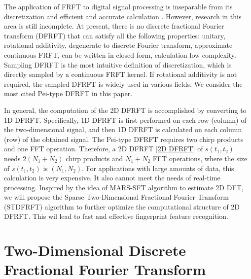 \documentclass[conference]{IEEEtran}
\begin{document}
The application of FRFT to digital signal processing is inseparable from its discretization and efficient and accurate calculation \cite{b4}. However, research in this area is still incomplete. At present, there is no discrete fractional Fourier transform (DFRFT) that can satisfy all the following properties: unitary, rotational additivity, degenerate to discrete Fourier transform, approximate continuous FRFT, can be written in closed form, calculation low complexity. Sampling DFRFT is the most intuitive definition of discretization, which is directly sampled by a continuous FRFT kernel. If rotational additivity is not required, the sampled DFRFT is widely used in various fields. We consider the most cited Pei-type \cite{b2} DFRFT in this paper.

In general, the computation of the 2D DFRFT \cite{Kumari2021} is accomplished by converting to 1D DFRFT. Specifically, 1D DFRFT is first performed on each row (column) of the two-dimensional signal, and then 1D DFRFT is calculated on each column (row) of the obtained signal. The Pei-type DFRFT requires two chirp products and one FFT operation. Therefore, a 2D DFRFT \eqref{2D DFRFT} of $s({t_1},{t_2})$ needs $2({N_1} + {N_2})$ chirp products and ${N_1} + {N_2}$ FFT operations, where the size of $s({t_1},{t_2})$ is $(N_1,N_2)$. For applications with large amounts of data, this calculation is very expensive. It also cannot meet the needs of real-time processing. Inspired by the idea of MARS-SFT \cite{b1} algorithm to estimate 2D DFT, we will propose the Sparse Two-Dimensional Fractional Fourier Transform (STDFRFT) algorithm to further optimize the computational structure of 2D DFRFT. This wil lead to fast and effective fingerprint feature recognition.


\section{Two-Dimensional Discrete Fractional Fourier Transform}
\end{document}

